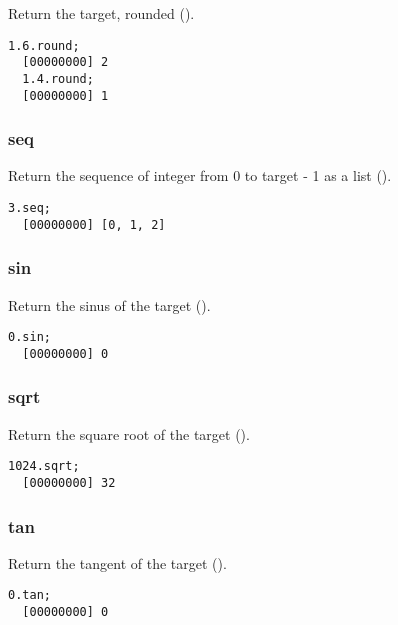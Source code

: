Return the target, rounded ().

\begin{lstlisting}[caption=Float.round, label=lst:float-round,
  float=\floatposh]
  1.6.round;
  [00000000] 2
  1.4.round;
  [00000000] 1
\end{lstlisting}

\subsubsection{seq}

Return the sequence of integer from 0 to target - 1 as a list ().

\begin{lstlisting}[caption=Float.seq, label=lst:float-seq,
  float=\floatposh]
  3.seq;
  [00000000] [0, 1, 2]
\end{lstlisting}

\subsubsection{sin}

Return the sinus of the target ().

\begin{lstlisting}[caption=Float.sin, label=lst:float-sin,
  float=\floatposh]
  0.sin;
  [00000000] 0
\end{lstlisting}

\subsubsection{sqrt}

Return the square root of the target ().

\begin{lstlisting}[caption=Float.sqrt, label=lst:float-sqrt,
  float=\floatposh]
  1024.sqrt;
  [00000000] 32
\end{lstlisting}

\subsubsection{tan}

Return the tangent of the target ().

\begin{lstlisting}[caption=Float.tan, label=lst:float-tan,
  float=\floatposh]
  0.tan;
  [00000000] 0
\end{lstlisting}

